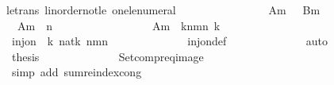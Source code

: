 \begin{isabellebody}
le{\isacharunderscore}trans\ linorder{\isacharunderscore}not{\isacharunderscore}le\ one{\isacharunderscore}le{\isacharunderscore}numeral{\isacharparenright}\isanewline
\ \ \ \ \isamarkupfalse%
\isanewline
\isanewline
\ \ \ \ \isamarkupfalse%
\isanewline
\ \ \ \ \isamarkupfalse%
\ {\isachardoublequoteopen}{\isasymSum}\ {\isacharquery}Am\ {\isacharequal}\ {\isasymSum}\ {\isacharquery}Bm{\isachardoublequoteclose}\isanewline
\ \ \ \ \isamarkupfalse%
{\isacharminus}\isanewline
\ \ \ \ \ \ \isamarkupfalse%
\ {\isachardoublequoteopen}{\isacharparenleft}{\isasymSum}\ {\isacharquery}Am{\isacharparenright}\ {\isacharequal}\ {}{\isacharcircum}n{\isachardoublequoteclose}\isanewline
\ \ \ \ \ \ \isamarkupfalse%
{\isacharminus}\isanewline
\ \ \ \ \ \ \ \ \isamarkupfalse%
\ {\isachardoublequoteopen}{\isasymSum}\ {\isacharquery}Am{\isacharprime}\ {\isacharequal}\ {\isacharparenleft}{\isasymSum}k{\isasymin}{\isacharbraceleft}n{\isacharminus}m{\isacharplus}{}{\isachardot}{\isachardot}{\isacharless}n{\isacharbraceright}{\isachardot}\ {}{\isacharasterisk}{}{\isacharcircum}k{\isacharparenright}{\isachardoublequoteclose}\isanewline
\ \ \ \ \ \ \ \ \isamarkupfalse%
{\isacharminus}\isanewline
\ \ \ \ \ \ \ \ \ \ \isamarkupfalse%
\ {\isachardoublequoteopen}inj{\isacharunderscore}on\ {\isacharparenleft}{\isasymlambda}\ k{\isachardot}\ {}{\isacharasterisk}{\isacharparenleft}{}{\isacharcolon}{\isacharcolon}nat{\isacharparenright}{\isacharcircum}k{\isacharparenright}\ {\isacharbraceleft}n{\isacharminus}m{\isacharplus}{}{\isachardot}{\isachardot}{\isacharless}n{\isacharbraceright}{\isachardoublequoteclose}\isanewline
\ \ \ \ \ \ \ \ \ \ \ \ \isamarkupfalse%
\ inj{\isacharunderscore}on{\isacharunderscore}def\isanewline
\ \ \ \ \ \ \ \ \ \ \ \ \isamarkupfalse%
\ auto\isanewline
\ \ \ \ \ \ \ \ \ \ \isamarkupfalse%
\ {\isacharquery}thesis\isanewline
\ \ \ \ \ \ \ \ \ \ \ \ \isamarkupfalse%
\ Setcompr{\isacharunderscore}eq{\isacharunderscore}image\isanewline
\ \ \ \ \ \ \ \ \ \ \ \ \isamarkupfalse%
\ {\isacharparenleft}simp\ add{\isacharcolon}\ sum{\isachardot}reindex{\isacharunderscore}cong{\isacharparenright}\isanewline
\ \ \ \ \ \ \ \ \isamarkupfalse%
\isanewline
\ \ \ \ \ \ \ \ \isamarkupfalse%
\ \isamarkupfalse%

\end{isabellebody}
